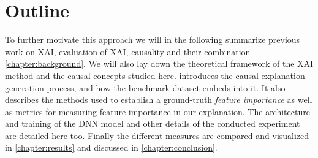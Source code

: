 \section{Outline}
To further motivate this approach we will in the following summarize previous work on XAI, evaluation of XAI, causality and their combination \cref{chapter:background}. We will also lay down the theoretical framework of the XAI method and the causal concepts studied here.  introduces the causal explanation generation process, and how the benchmark dataset embeds into it. It also describes the methods used to establish a ground-truth \textit{feature importance} as well as metrics for measuring feature importance in our explanation. The architecture and training of the DNN model and other details of the conducted experiment are detailed here too. Finally the different measures are compared and visualized in \cref{chapter:results} and discussed in \cref{chapter:conclusion}.
